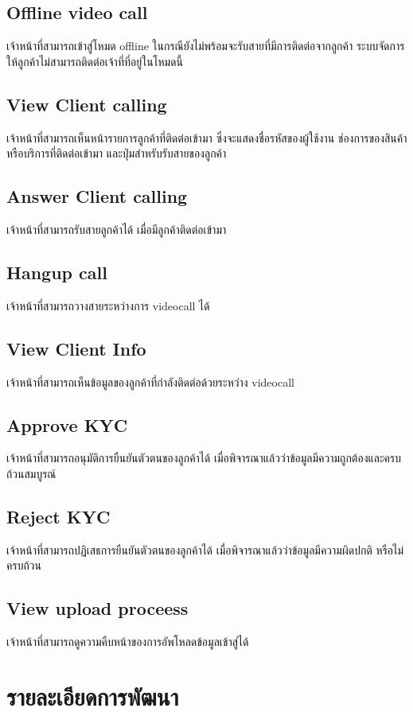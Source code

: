 \subsection{Offline video call}
เจ้าหน้าที่สามารถเข้าสู่โหมด offline ในกรณียังไม่พร้อมจะรับสายที่มีการติดต่อจากลูกค้า ระบบจัดการให้ลูกค้าไม่สามารถติดต่อเจ้าที่ที่อยู่ในโหมดนี้
\subsection{View Client calling}
เจ้าหน้าที่สามารถเห็นหน้ารายการลูกค้าที่ติดต่อเข้ามา ซึ่งจะแสดงชื่อรหัสของผู้ใช้งาน ช่องการของสินค้าหรือบริการที่ติดต่อเข้ามา และปุ่มสำหรับรับสายของลูกค้า
\subsection{Answer Client calling}
เจ้าหน้าที่สามารถรับสายลูกค้าได้ เมื่อมีลูกค้าติดต่อเข้ามา
\subsection{Hangup call}
เจ้าหน้าที่สามารถวางสายระหว่างการ videocall ได้
\subsection{View Client Info}
เจ้าหน้าที่สามารถเห็นข้อมูลของลูกค้าที่กำลังติดต่อด้วยระหว่าง videocall
\subsection{Approve KYC}
เจ้าหน้าที่สามารถอนุมัติการยืนยันตัวตนของลูกค้าได้ เมื่อพิจารณาแล้วว่าข้อมูลมีความถูกต้องและครบถ้วนสมบูรณ์
\subsection{Reject KYC}
เจ้าหน้าที่สามารถปฏิเสธการยืนยันตัวตนของลูกค้าได้ เมื่อพิจารณาแล้วว่าข้อมูลมีความผิดปกติ หรือไม่ครบถ้วน
\subsection{View upload proceess}
เจ้าหน้าที่สามารถดูความคืบหน้าของการอัพโหลดข้อมูลเข้าสู่ได้

\section{รายละเอียดการพัฒนา}

